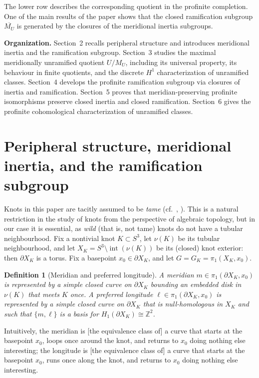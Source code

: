 \documentclass[11pt]{article}
\newtheorem{definition}[theorem]{Definition}
\begin{document}
	The lower row describes the corresponding quotient in the profinite completion. One of the main results of the paper shows that the closed ramification subgroup $\overline{M_U}$ is generated by the closures of the meridional inertia subgroups.
	
	\medskip
	\noindent\textbf{Organization.}
	Section~2 recalls peripheral structure and introduces meridional inertia and the ramification subgroup. Section~3 studies the maximal meridionally unramified quotient $U/M_U$, including its universal property, its behaviour in finite quotients, and the discrete $H^1$ characterization of unramified classes. Section~4 develops the profinite ramification subgroup via closures of inertia and ramification. Section~5 proves that meridian-preserving profinite isomorphisms preserve closed inertia and closed ramification. Section~6 gives the profinite cohomological characterization of unramified classes.
	
	\section{Peripheral structure, meridional inertia, and the ramification subgroup}
	Knots in this paper are tacitly assumed to be \textit{tame} (cf.~\cite[Section 1.A]{burzie}, \cite[Section 1.2]{crofox}). This is a natural restriction in the study of knots from the perspective of algebraic topology, but in our case it is essential, as \textit{wild} (that is, not tame) knots do not have a tubular neighbourhood.
	Fix a nontivial knot $K\subset S^3$, let $\nu(K)$ be its tubular neighbourhood, and let $X_K = S^3\setminus\operatorname{int}(\nu(K))$ be its (closed) knot exterior: then $\partial X_K$ is a torus. Fix a basepoint $x_0\in \partial X_K$, and let $G = G_K = \pi_1(X_K,x_0)$.
	
	\begin{definition}[Meridian and preferred longitude]
		A \emph{meridian} $m\in \pi_1(\partial X_K,x_0)$ is represented by a simple closed curve on $\partial X_K$ bounding an embedded disk in $\nu(K)$ that meets $K$ once. A \emph{preferred longitude} $\ell\in \pi_1(\partial X_K,x_0)$ is represented by a simple closed curve on $\partial X_K$ that is null-homologous in $X_K$ and such that $\{m,\ell\}$ is a basis for $H_1(\partial X_K)\cong \mathbb Z^2$.
	\end{definition}
	Intuitively, the meridian is [the equivalence class of] a curve that starts at the basepoint $x_0$, loops once around the knot, and returns to $x_0$ doing nothing else interesting; the longitude is [the equivalence class of] a curve that starts at the basepoint $x_0$, runs once along the knot, and returns to $x_0$ doing nothing else interesting.
	
\end{document}
